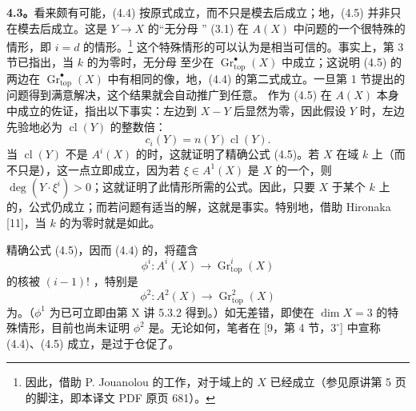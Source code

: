 \textbf{4.3。}看来颇有可能，(4.4) 按原式成立，而不只是模去后成立；地，(4.5) 并非只在模去后成立。这是 $Y\to X$ 的“无分母 ” (3.1) 在 $A(X)$ 中问题的一个很特殊的情形，即 $i=d$ 的情形。\footnote{因此，借助 P. Jouanolou 的工作，对于域上的 $X$ 已经成立（参见原讲第 5 页的脚注，即本译文 PDF 原页 681）。}
这个特殊情形的可以认为是相当可信的。事实上，第 3 节已指出，当 $k$ 的为零时，无分母 至少在 $\operatorname{Gr}_{\mathrm{top}}^\bullet(X)$ 中成立；这说明 (4.5) 的两边在 $\operatorname{Gr}_{\mathrm{top}}^\bullet(X)$ 中有相同的像，地，(4.4) 的第二式成立。一旦第 1 节提出的问题得到满意解决，这个结果就会自动推广到任意。
作为 (4.5) 在 $A(X)$ 本身中成立的佐证，指出以下事实：左边到 $X-Y$ 后显然为零，因此假设 $Y$ 时，左边先验地必为 $\operatorname{cl}(Y)$ 的整数倍：
\[c_i(Y)=n(Y)\operatorname{cl}(Y).\]
当 $\operatorname{cl}(Y)$ 不是 $A^i(X)$ 的时，这就证明了精确公式 (4.5)。若 $X$ 在域 $k$ 上（而不只是），这一点立即成立，因为若 $\xi\in A^1(X)$ 是 $X$ 的一个，则 $\deg(Y\cdot\xi^i)>0$；这就证明了此情形所需的公式。因此，只要 $X$ 于某个 $k$ 上的，公式仍成立；而若问题有适当的解，这就是事实。特别地，借助 Hironaka [11]，当 $k$ 的为零时就是如此。

精确公式 (4.5)，因而 (4.4) 的，将蕴含
\[\phi^i:A^i(X)\longrightarrow\operatorname{Gr}_{\mathrm{top}}^i(X)\]
的核被 $(i-1)!$ ，特别是
\[\phi^2:A^2(X)\longrightarrow\operatorname{Gr}_{\mathrm{top}}^2(X)\]
为。（$\phi^1$ 为已可立即由第 X 讲 5.3.2 得到。）如无差错，即使在 $\dim X=3$ 的特殊情形，目前也尚未证明 $\phi^2$ 是。无论如何，笔者在 [9，第 4 节，$3^\circ$] 中宣称 (4.4)、(4.5) 成立，是过于仓促了。

